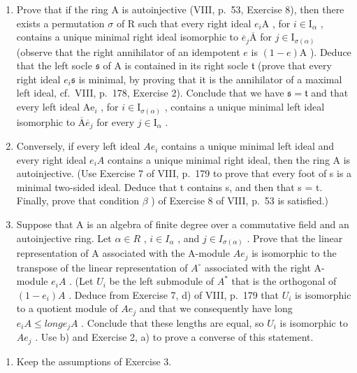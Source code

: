 \begin{enumerate}
\def\labelenumi{\alph{enumi})}
\item
  Prove that if the ring A is autoinjective (VIII, p.~53, Exercise 8), then there exists a permutation \(\sigma\) of R such that every right ideal \(e_i\mathrm{A}\) , for \(i\in \mathrm{I}_{\alpha}\) , contains a unique minimal right ideal isomorphic to \(\overline{e}_j\overline{\mathrm{A}}\) for \(j\in \mathrm{I}_{\sigma (\alpha)}\) (observe that the right annihilator of an idempotent \(e\) is \((1 - e)\mathrm{A}\) ). Deduce that the left socle \(\mathfrak{s}\) of A is contained in its right socle \(\mathfrak{t}\) (prove that every right ideal \(e_i\mathfrak{s}\) is minimal, by proving that it is the annihilator of a maximal left ideal, cf.~VIII, p.~178, Exercise 2). Conclude that we have \(\mathfrak{s} = \mathfrak{t}\) and that every left ideal \(\mathrm{Ae}_i\) , for \(i\in \mathrm{I}_{\sigma (\alpha)}\) , contains a unique minimal left ideal isomorphic to \(\overline{\mathrm{A}}\overline{e}_j\) for every \(j\in \mathrm{I}_{\alpha}\) .
\item
  Conversely, if every left ideal \(Ae_{i}\) contains a unique minimal left ideal and every right ideal \(e_{i}A\) contains a unique minimal right ideal, then the ring A is autoinjective. (Use Exercise 7 of VIII, p.~179 to prove that every foot of s is a minimal two-sided ideal. Deduce that t contains s, and then that s = t. Finally, prove that condition \(\beta\) ) of Exercise 8 of VIII, p.~53 is satisfied.)
\item
  Suppose that A is an algebra of finite degree over a commutative field and an autoinjective ring. Let \(\alpha \in R\) , \(i \in I_{\alpha}\) , and \(j \in I_{\sigma(\alpha)}\) . Prove that the linear representation of A associated with the A-module \(Ae_{j}\) is isomorphic to the transpose of the linear representation of \(A^{\circ}\) associated with the right A-module \(e_{i}A\) . (Let \(U_{i}\) be the left submodule of \(A^{*}\) that is the orthogonal of \((1 - e_{i})A\) . Deduce from Exercise 7, d) of VIII, p.~179 that \(U_{i}\) is isomorphic to a quotient module of \(Ae_{j}\) and that we consequently have long \(e_{i}A \leqslant long e_{j}A\) . Conclude that these lengths are equal, so \(U_{i}\) is isomorphic to \(Ae_{j}\) . Use b) and Exercise 2, a) to prove a converse of this statement.
\end{enumerate}

\begin{enumerate}
\def\labelenumi{\arabic{enumi})}
\setcounter{enumi}{3}
\tightlist
\item
  Keep the assumptions of Exercise 3.
\end{enumerate}

